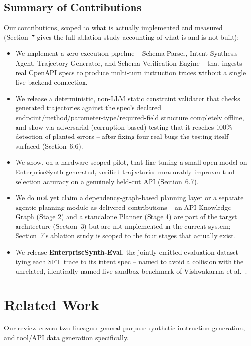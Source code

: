 \documentclass[11pt]{article}
\begin{document}
\subsection{Summary of Contributions}
Our contributions, scoped to what is actually implemented and measured (Section~7 gives the full
ablation-study accounting of what is and is not built):
\begin{itemize}
    \item We implement a zero-execution pipeline -- Schema Parser, Intent Synthesis Agent,
    Trajectory Generator, and Schema Verification Engine -- that ingests real OpenAPI specs to
    produce multi-turn instruction traces without a single live backend connection.
    \item We release a deterministic, non-LLM static constraint validator that checks generated
    trajectories against the spec's declared endpoint/method/parameter-type/required-field
    structure completely offline, and show via adversarial (corruption-based) testing that it
    reaches 100\% detection of planted errors -- after fixing four real bugs the testing itself
    surfaced (Section~6.6).
    \item We show, on a hardware-scoped pilot, that fine-tuning a small open model on
    EnterpriseSynth-generated, verified trajectories measurably improves tool-selection accuracy
    on a genuinely held-out API (Section~6.7).
    \item We do \textbf{not} yet claim a dependency-graph-based planning layer or a separate
    agentic planning module as delivered contributions -- an API Knowledge Graph (Stage 2) and a
    standalone Planner (Stage 4) are part of the target architecture (Section~3) but are not
    implemented in the current system; Section~7's ablation study is scoped to the four stages
    that actually exist.
    \item We release \textbf{EnterpriseSynth-Eval}, the jointly-emitted evaluation dataset tying
    each SFT trace to its intent spec -- named to avoid a collision with the unrelated,
    identically-named live-sandbox benchmark of Vishwakarma et
    al.~\cite{vishwakarma2025enterprisebench}.
\end{itemize}

\section{Related Work}
Our review covers two lineages: general-purpose synthetic instruction generation, and tool/API
data generation specifically.
\end{document}
